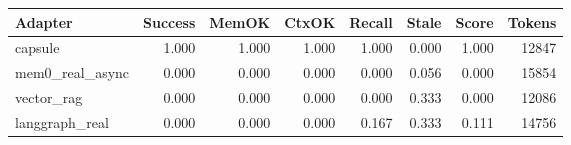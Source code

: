 \begin{tabular}{lrrrrrrr}
\hline
Adapter & Success & MemOK & CtxOK & Recall & Stale & Score & Tokens \\
\hline
capsule & 1.000 & 1.000 & 1.000 & 1.000 & 0.000 & 1.000 & 12847 \\
mem0\_real\_async & 0.000 & 0.000 & 0.000 & 0.000 & 0.056 & 0.000 & 15854 \\
vector\_rag & 0.000 & 0.000 & 0.000 & 0.000 & 0.333 & 0.000 & 12086 \\
langgraph\_real & 0.000 & 0.000 & 0.000 & 0.167 & 0.333 & 0.111 & 14756 \\
\hline
\end{tabular}
